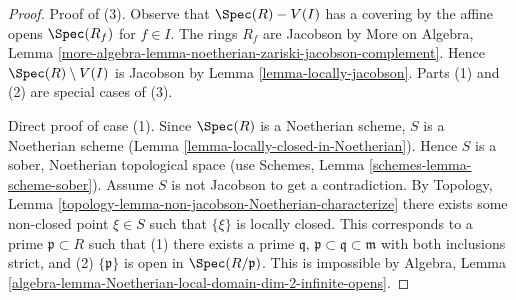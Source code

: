 \begin{proof}
Proof of (3). Observe that $\Spec(R) - V(I)$ has a covering by the affine
opens $\Spec(R_f)$ for $f \in I$. The rings $R_f$ are Jacobson by
More on Algebra, Lemma
\ref{more-algebra-lemma-noetherian-zariski-jacobson-complement}.
Hence $\Spec(R) \setminus V(I)$ is Jacobson by
Lemma \ref{lemma-locally-jacobson}.
Parts (1) and (2) are special cases of (3).

\medskip\noindent
Direct proof of case (1).
Since $\Spec(R)$ is a Noetherian scheme,
$S$ is a Noetherian scheme (Lemma \ref{lemma-locally-closed-in-Noetherian}).
Hence $S$ is a sober, Noetherian topological space (use
Schemes, Lemma \ref{schemes-lemma-scheme-sober}).
Assume $S$ is not Jacobson to
get a contradiction. By
Topology, Lemma \ref{topology-lemma-non-jacobson-Noetherian-characterize}
there exists some non-closed point $\xi \in S$
such that $\{\xi\}$ is locally closed. This corresponds
to a prime $\mathfrak p \subset R$ such that (1) there exists
a prime $\mathfrak q$, $\mathfrak p \subset \mathfrak q \subset \mathfrak m$
with both inclusions strict, and (2) $\{\mathfrak p\}$ is open in
$\Spec(R/\mathfrak p)$. This is impossible by Algebra,
Lemma \ref{algebra-lemma-Noetherian-local-domain-dim-2-infinite-opens}.
\end{proof}







